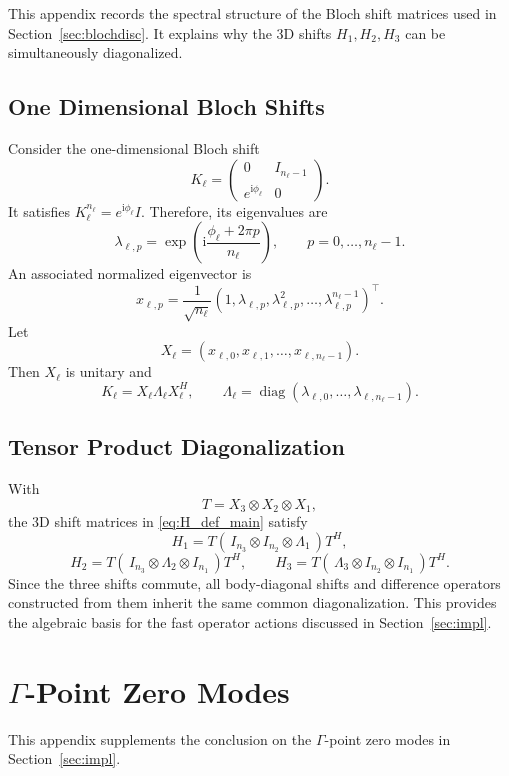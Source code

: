 \documentclass[11pt,oneside]{article}
\numberwithin{equation}{section}
\theoremstyle{plain}
\theoremstyle{remark}
\begin{document}
This appendix records the spectral structure of the Bloch shift matrices used in Section~\ref{sec:blochdisc}. It explains why the 3D shifts \(H_1,H_2,H_3\) can be simultaneously diagonalized.

\subsection{One Dimensional Bloch Shifts}

Consider the one-dimensional Bloch shift
\[
K_\ell=
\begin{pmatrix}
0 & I_{n_\ell-1}\\
e^{\mathrm i\phi_\ell} & 0
\end{pmatrix}.
\]
It satisfies \(K_\ell^{n_\ell}=e^{\mathrm i\phi_\ell}I\). Therefore, its eigenvalues are
\[
\lambda_{\ell,p}
=
\exp\!\left(\mathrm i\frac{\phi_\ell+2\pi p}{n_\ell}\right),
\qquad p=0,\ldots,n_\ell-1.
\]
An associated normalized eigenvector is
\[
x_{\ell,p}
=
\frac{1}{\sqrt{n_\ell}}
(1,\lambda_{\ell,p},\lambda_{\ell,p}^2,\ldots,\lambda_{\ell,p}^{n_\ell-1})^\top .
\]
Let
\[
X_\ell=(x_{\ell,0},x_{\ell,1},\ldots,x_{\ell,n_\ell-1}).
\]
Then \(X_\ell\) is unitary and
\[
K_\ell=X_\ell\Lambda_\ell X_\ell^H,
\qquad
\Lambda_\ell=\operatorname{diag}(\lambda_{\ell,0},\ldots,\lambda_{\ell,n_\ell-1}).
\]

\subsection{Tensor Product Diagonalization}

With
\[
T=X_3\otimes X_2\otimes X_1,
\]
the 3D shift matrices in \eqref{eq:H_def_main} satisfy
\[
H_1=T(\,I_{n_3}\otimes I_{n_2}\otimes\Lambda_1\,)T^H,
\]
\[
H_2=T(\,I_{n_3}\otimes \Lambda_2\otimes I_{n_1}\,)T^H,
\qquad
H_3=T(\,\Lambda_3\otimes I_{n_2}\otimes I_{n_1}\,)T^H.
\]
Since the three shifts commute, all body-diagonal shifts and difference operators constructed from them inherit the same common diagonalization. This provides the algebraic basis for the fast operator actions discussed in Section~\ref{sec:impl}.

\section{\texorpdfstring{\(\Gamma\)-Point Zero Modes}{Gamma Point Zero Modes}}
\label{app:gamma_null}

This appendix supplements the conclusion on the \(\Gamma\)-point zero modes in Section~\ref{sec:impl}.
\end{document}
